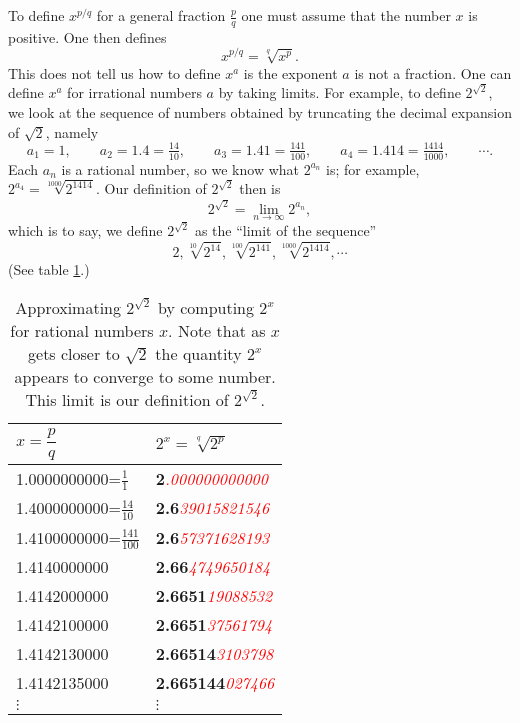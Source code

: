 To define $x^{p/q}$ for a general fraction $\frac p q$ one must assume
that the number $x$ is positive. One then defines
\begin{equation}\label{eq:pqpowerofx-def}
  x^{p/q}= \sqrt[q]{x^p}.
\end{equation}
This does not tell us how to define $x^a$ is the exponent $a$ is not a fraction.
One can define $x^a$ for irrational numbers $a$ by taking limits.  For example,
to define $2^{\sqrt{2}}$, we look at the sequence of numbers obtained by truncating
the decimal expansion of $\sqrt{2}$, namely
\[
a_1 = 1,
\qquad   a_2= 1.4=\tfrac{14}{10},
\qquad    a_3=1.41=\tfrac{141}{100},
\qquad a_4= 1.414=\tfrac{1414}{1000},
\qquad   \cdots.
\]
Each $a_n$ is a rational number, so we know what $2^{a_n}$ is; for example,
$2^{a_4} = \sqrt[1000]{2^{1414}}$.  Our definition of $2^{\sqrt{2}}$ then is
\[
2^{\sqrt{ 2}} = \lim_{n\to\infty} 2^{a_n},
\]
which is to say, we define $2^{\sqrt{2}}$ as the ``limit of the sequence''
\[
2, \sqrt[10]{2^{14}}, \sqrt[100]{2^{141}}, \sqrt[1000]{2^{1414}}, \cdots
\]
(See table \ref{tbl:07twototheroottwo}.)




\begin{table}[htp]
  \begin{center}
    \begin{tabular}{ll}
      \toprule
      $x=\dfrac pq$  &  $\displaystyle 2^x = \sqrt[q]{2^p}$\\
      \midrule
      1.0000000000=$\frac11$ &
      \textbf{2}\textit{\textcolor{red}{.000000000000}}  \\[2pt]
      1.4000000000=$\frac{14}{10}$ &
      \textbf{2.6}\textit{\textcolor{red}{39015821546}}  \\[2pt]
      1.4100000000=$\frac{141}{100}$  &
      \textbf{2.6}\textit{\textcolor{red}{57371628193}}  \\[2pt]
      1.4140000000 &  \textbf{2.66}\textit{\textcolor{red}{4749650184}}  \\
      1.4142000000 &  \textbf{2.6651}\textit{\textcolor{red}{19088532}}  \\
      1.4142100000 &  \textbf{2.6651}\textit{\textcolor{red}{37561794}}  \\
      1.4142130000 &  \textbf{2.66514}\textit{\textcolor{red}{3103798}}  \\
      1.4142135000 &  \textbf{2.665144}\textit{\textcolor{red}{027466}}  \\
      $\vdots$  &\hspace{24pt} $\vdots$\\
      \bottomrule
    \end{tabular}
  \end{center}\smallskip
  \caption{Approximating $2^{\sqrt{2}}$ by computing $2^x$ for rational
numbers $x$.  Note that as $x$ gets closer to $\sqrt2$ the quantity
$2^x$ appears to converge to some number.  This limit is our
definition of $2^{\sqrt{2}}$.}
  \label{tbl:07twototheroottwo}
\end{table}%








